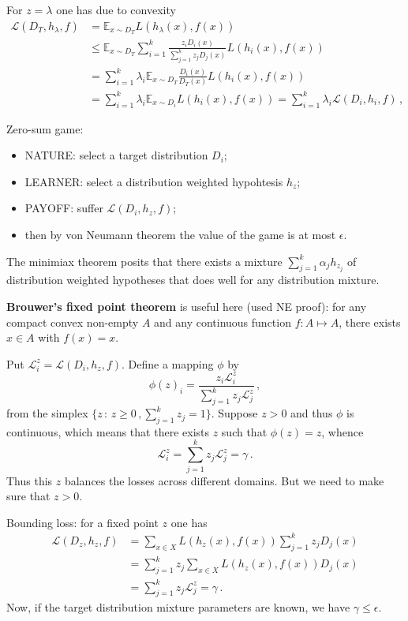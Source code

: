 \documentclass[a4paper]{article}
\newcommand{\ex}{\mathbb{E}}
\begin{document}
For $z=\lambda$ one has due to convexity 
\begin{align*}
    \mathcal{L}(D_T, h_\lambda, f)
    &= \ex_{x\sim D_T} L(h_\lambda(x), f(x)) \\
    &\leq \ex_{x\sim D_T} \sum_{i=1}^k
        \frac{z_i D_i(x)}{\sum_{j=1}^k z_j D_j(x)} L(h_i(x), f(x)) \\
    &= \sum_{i=1}^k
        \lambda_i  \ex_{x\sim D_T} \frac{D_i(x)}{D_T(x)} L(h_i(x), f(x)) \\
    &= \sum_{i=1}^k \lambda_i \ex_{x\sim D_i} L(h_i(x), f(x))
    = \sum_{i=1}^k \lambda_i \mathcal{L}(D_i, h_i, f) \,,
\end{align*}

Zero-sum game: \begin{itemize}
    \item NATURE: select a target distribution $D_i$;
    \item LEARNER: select a distribution weighted hypohtesis $h_z$;
    \item PAYOFF: suffer $\mathcal{L}(D_i, h_z, f)$;
    \item then by von Neumann theorem the value of the game is at most $\epsilon$.
\end{itemize}
The minimiax theorem posits that there exists a mixture $\sum_{j=1}^k \alpha_j h_{z_j}$
of distribution weighted hypotheses that does well for any distribution mixture.

\textbf{Brouwer's fixed point theorem} is useful here (used NE proof): for any compact
convex non-empty $A$ and any continuous function $f:A\mapsto A$, there exists $x\in A$
with $f(x) = x$.

Put $\mathcal{L}_i^z = \mathcal{L}(D_i, h_z, f)$. Define a mapping $\phi$ by
\[ \phi(z)_i = \frac{z_i \mathcal{L}_i^z}{\sum_{j=1}^k z_j \mathcal{L}_j^z} \,, \]
from the simplex $\{z\,:\, z\geq 0\,,\sum_{j=1}^k z_j = 1\}$.
Suppose $z>0$ and thus $\phi$ is continuous, which means that there exists $z$ such
that $\phi(z) = z$, whence
\[ \mathcal{L}_i^z = \sum_{j=1}^k z_j \mathcal{L}_j^z = \gamma \,.\]
Thus this $z$ balances the losses across different domains. But we need to make
sure that $z>0$. 

Bounding loss: for a fixed point $z$ one has
\begin{align*}
    \mathcal{L}(D_z, h_z, f)
        &= \sum_{x\in X} L(h_z(x), f(x)) \sum_{j=1}^k z_j D_j(x) \\ 
        &= \sum_{j=1}^k z_j \sum_{x\in X} L(h_z(x), f(x)) D_j(x) \\ 
        &= \sum_{j=1}^k z_j \mathcal{L}_j^z  = \gamma \,. 
\end{align*}
Now, if the target distribution mixture parameters are known, we have $\gamma\leq \epsilon$.
\end{document}
